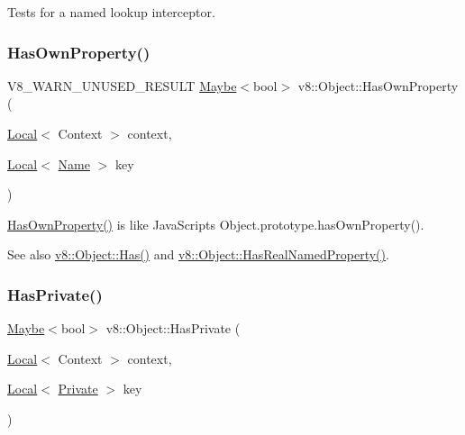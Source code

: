 Tests for a named lookup interceptor. \mbox{\label{classv8_1_1Object_acdd3921e95d5bb1a27cea489792607ff}} 
\subsubsection{\texorpdfstring{Has\+Own\+Property()}{HasOwnProperty()}}
{\footnotesize\ttfamily V8\+\_\+\+W\+A\+R\+N\+\_\+\+U\+N\+U\+S\+E\+D\+\_\+\+R\+E\+S\+U\+LT \mbox{\hyperlink{classv8_1_1Maybe}{Maybe}}$<$bool$>$ v8\+::\+Object\+::\+Has\+Own\+Property (\begin{DoxyParamCaption}\item[{\mbox{\hyperlink{classv8_1_1Local}{Local}}$<$ Context $>$}]{context,  }\item[{\mbox{\hyperlink{classv8_1_1Local}{Local}}$<$ \mbox{\hyperlink{classv8_1_1Name}{Name}} $>$}]{key }\end{DoxyParamCaption})}

\mbox{\hyperlink{classv8_1_1Object_acdd3921e95d5bb1a27cea489792607ff}{Has\+Own\+Property()}} is like Java\+Script\textquotesingle{}s Object.\+prototype.\+has\+Own\+Property().

See also \mbox{\hyperlink{classv8_1_1Object_a57d4819c2cc13715ed22dd23cdc84d7c}{v8\+::\+Object\+::\+Has()}} and \mbox{\hyperlink{classv8_1_1Object_ad830b937c7586fe2086b288ea79935c4}{v8\+::\+Object\+::\+Has\+Real\+Named\+Property()}}. \mbox{\label{classv8_1_1Object_aad699867935fd2142ec97afa6e39a7f0}} 
\subsubsection{\texorpdfstring{Has\+Private()}{HasPrivate()}}
{\footnotesize\ttfamily \mbox{\hyperlink{classv8_1_1Maybe}{Maybe}}$<$bool$>$ v8\+::\+Object\+::\+Has\+Private (\begin{DoxyParamCaption}\item[{\mbox{\hyperlink{classv8_1_1Local}{Local}}$<$ Context $>$}]{context,  }\item[{\mbox{\hyperlink{classv8_1_1Local}{Local}}$<$ \mbox{\hyperlink{classv8_1_1Private}{Private}} $>$}]{key }\end{DoxyParamCaption})}

